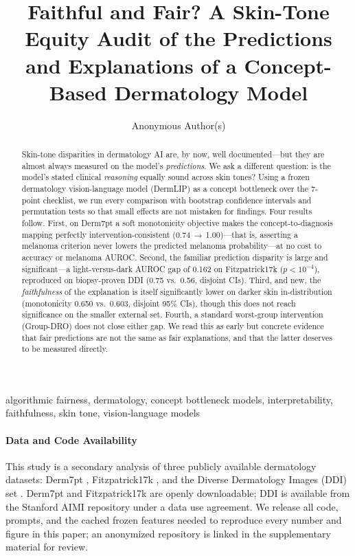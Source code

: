 \documentclass[pmlr,twocolumn,10pt]{jmlr}
\title[Faithful and Fair?]{Faithful and Fair? A Skin-Tone Equity Audit of the
Predictions and Explanations of a Concept-Based Dermatology Model}
\author{Anonymous Author(s)}
\begin{document}
\maketitle

\ifmlhdemo\else
\begin{abstract}
Skin-tone disparities in dermatology AI are, by now, well documented---but they
are almost always measured on the model's \emph{predictions}. We ask a
different question: is the model's stated clinical \emph{reasoning} equally
sound across skin tones? Using a frozen dermatology vision-language model
(DermLIP) as a concept bottleneck over the 7-point checklist, we run every
comparison with bootstrap confidence intervals and permutation tests so that
small effects are not mistaken for findings. Four results follow. First, on
Derm7pt a soft monotonicity objective makes the concept-to-diagnosis mapping
perfectly intervention-consistent (0.74\,$\rightarrow$\,1.00)---that is,
asserting a melanoma criterion never lowers the predicted melanoma
probability---at no cost to accuracy or melanoma AUROC. Second, the familiar
prediction disparity is large and significant---a light-versus-dark AUROC gap of
0.162 on Fitzpatrick17k ($p<10^{-4}$), reproduced on biopsy-proven DDI (0.75
vs.\ 0.56, disjoint CIs). Third, and new, the \emph{faithfulness} of the
explanation is itself significantly lower on darker skin in-distribution
(monotonicity 0.650 vs.\ 0.603, disjoint 95\% CIs), though this does not reach
significance on the smaller external set. Fourth, a standard worst-group
intervention (Group-DRO) does not close either gap. We read this as early but concrete evidence that
fair predictions are not the same as fair explanations, and that the latter
deserves to be measured directly.
\end{abstract}
\begin{keywords}
algorithmic fairness, dermatology, concept bottleneck models, interpretability,
faithfulness, skin tone, vision-language models
\end{keywords}
\fi

\ifmlhneedsstatements
\paragraph*{Data and Code Availability}
This study is a secondary analysis of three publicly available dermatology
datasets: Derm7pt \citep{kawahara2019sevenpoint}, Fitzpatrick17k
\citep{groh2021evaluating}, and the Diverse Dermatology Images (DDI) set
\citep{daneshjou2022disparities}. Derm7pt and Fitzpatrick17k are openly
downloadable; DDI is available from the Stanford AIMI repository under a data
use agreement. We release all code, prompts, and the cached frozen features
needed to reproduce every number and figure in this paper; an anonymized
repository is linked in the supplementary material for review.
\end{document}
